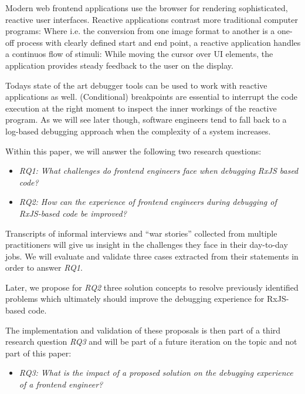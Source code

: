 \documentclass[12pt,a4paper]{article}
\begin{document}
Modern web frontend applications use the browser for rendering sophisticated, reactive user interfaces. Reactive applications contrast more traditional computer programs: Where i.e. the conversion from one image format to another is a one-off process with clearly defined start and end point, a reactive application handles a continuos flow of stimuli: While moving the cursor over UI elements, the application provides steady feedback to the user on the display.

Todays state of the art debugger tools can be used to work with reactive applications as well. (Conditional) breakpoints are essential to interrupt the code execution at the right moment to inspect the inner workings of the reactive program. As we will see later though, software engineers tend to fall back to a log-based debugging approach when the complexity of a system increases.


Within this paper, we will answer the following two research questions:

\begin{itemize}
	\item \emph{RQ1: What challenges do frontend engineers face when debugging RxJS based code?}
	\item \emph{RQ2: How can the experience of frontend engineers during debugging of RxJS-based code be improved?}
\end{itemize}

Transcripts of informal interviews and ``war stories'' collected from multiple practitioners will give us insight in the challenges they face in their day-to-day jobs. We will evaluate and validate three cases extracted from their statements in order to answer \emph{RQ1}.

Later, we propose for \emph{RQ2} three solution concepts to resolve previously identified problems which ultimately should improve the debugging experience for RxJS-based code.

The implementation and validation of these proposals is then part of a third research question \emph{RQ3} and will be part of a future iteration on the topic and not part of this paper:

\begin{itemize}
	\item \emph{RQ3: What is the impact of a proposed solution on the debugging experience of a frontend engineer?}
\end{itemize}
\end{document}
